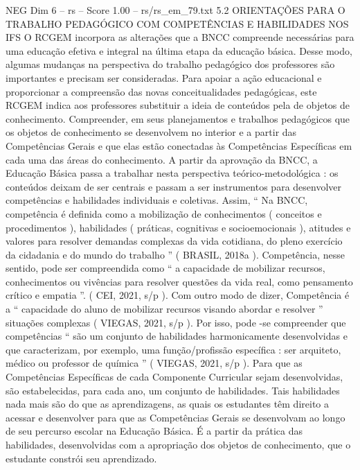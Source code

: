\begin{textsample}{NEG Dim 6 – rs – Score 1.00 – rs/rs\_em\_79.txt}  \label{ex:f6_neg_109}
5.2 ORIENTAÇÕES PARA O TRABALHO PEDAGÓGICO COM COMPETÊNCIAS E HABILIDADES NOS IFS O RCGEM incorpora as alterações que a BNCC compreende necessárias para uma educação efetiva e integral na última etapa da educação básica.
Desse modo, algumas mudanças na perspectiva do trabalho pedagógico dos professores são importantes e precisam ser consideradas.
Para apoiar a ação educacional e proporcionar a compreensão das novas conceitualidades pedagógicas, este RCGEM indica aos professores substituir a ideia de conteúdos pela de objetos de conhecimento.
Compreender, em seus planejamentos e trabalhos pedagógicos que os objetos de conhecimento se desenvolvem no interior e a partir das Competências Gerais e que elas estão conectadas às Competências Específicas em cada uma das áreas do conhecimento.
A partir da aprovação da BNCC, a Educação Básica passa a trabalhar nesta perspectiva teórico-metodológica : os conteúdos deixam de ser centrais e passam a ser instrumentos para desenvolver competências e habilidades individuais e coletivas.
Assim, “ Na BNCC, competência é definida como a mobilização de conhecimentos ( conceitos e procedimentos ), habilidades ( práticas, cognitivas e socioemocionais ), atitudes e valores para resolver demandas complexas da vida cotidiana, do pleno exercício da cidadania e do mundo do trabalho ” ( BRASIL, 2018a ).
Competência, nesse sentido, pode ser compreendida como “ a capacidade de mobilizar recursos, conhecimentos ou vivências para resolver questões da vida real, como pensamento crítico e empatia ”. ( CEI, 2021, s/p ).
Com outro modo de dizer, Competência é a “ capacidade do aluno de mobilizar recursos visando abordar e resolver ” situações complexas ( VIEGAS, 2021, s/p ).
Por isso, pode -se compreender que competências “ são um conjunto de habilidades harmonicamente desenvolvidas e que caracterizam, por exemplo, uma função/profissão específica : ser arquiteto, médico ou professor de química ” ( VIEGAS, 2021, s/p ).
Para que as Competências Específicas de cada Componente Curricular sejam desenvolvidas, são estabelecidas, para cada ano, um conjunto de habilidades.
Tais habilidades nada mais são do que as aprendizagens, as quais os estudantes têm direito a acessar e desenvolver para que as Competências Gerais se desenvolvam ao longo de seu percurso escolar na Educação Básica.
É a partir da prática das habilidades, desenvolvidas com a apropriação dos objetos de conhecimento, que o estudante constrói seu aprendizado.

\end{textsample}
